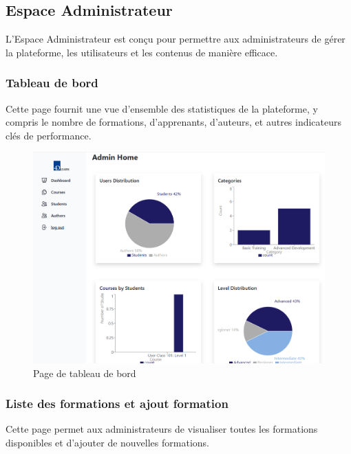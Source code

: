 \subsection{Espace Administrateur}

L'Espace Administrateur est conçu pour permettre aux administrateurs de gérer la plateforme, les utilisateurs et les contenus de manière efficace.

\subsubsection{Tableau de bord}

Cette page fournit une vue d'ensemble des statistiques de la plateforme, y compris le nombre de formations, d'apprenants, d'auteurs, et autres indicateurs clés de performance.

\begin{figure}[H]
    \centering
    \includegraphics[width=19cm]{Figures/dashboard.png}
    \caption{ Page de tableau de bord}
\end{figure}

\subsubsection{Liste des formations et ajout formation}

Cette page permet aux administrateurs de visualiser toutes les formations disponibles et d'ajouter de nouvelles formations.

